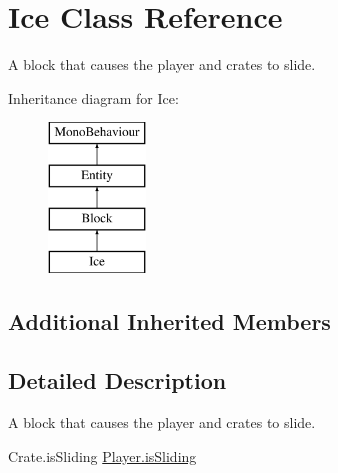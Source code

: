 \hypertarget{class_ice}{}\section{Ice Class Reference}
\label{class_ice}


A block that causes the player and crates to slide.  


Inheritance diagram for Ice\+:\begin{figure}[H]
\begin{center}
\leavevmode
\includegraphics[height=4.000000cm]{class_ice}
\end{center}
\end{figure}
\subsection*{Additional Inherited Members}


\subsection{Detailed Description}
A block that causes the player and crates to slide. 

Crate.\+is\+Sliding \mbox{\hyperlink{class_player_ae7c1a20db6171c3062e9dde30ea86048}{Player.\+is\+Sliding}} 